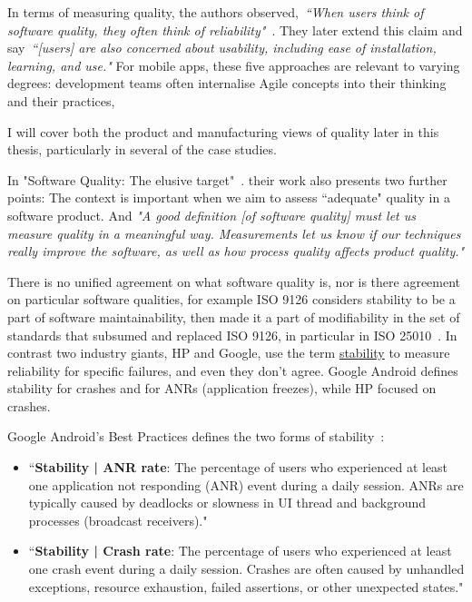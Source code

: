 In terms of measuring quality, the authors observed,~\emph{``When users think of software quality, they often think of reliability"}~\citep{kitchenham1996_software_quality_elusive_target}. They later extend this claim and say~\emph{``[users] are also concerned about usability, including ease of installation, learning, and use."}
%
For mobile apps, these five approaches are relevant to varying degrees: development teams often internalise Agile concepts into their thinking and their practices, %

I will cover both the product and manufacturing views of quality later in this thesis, particularly in several of the case studies.



In "Software Quality: The elusive target"~\cite{kitchenham1996_software_quality_elusive_target}. their work also presents two further points: The context is important when we aim to assess ``adequate" quality in a software product. And \emph{"A good definition [of software quality] must let us measure quality in a meaningful way. Measurements let us know if our techniques really improve the software, as well as how process quality affects product quality."}


There is no unified agreement on what software quality is, nor is there agreement on particular software qualities, for example ISO 9126 considers stability to be a part of software maintainability, then made it a part of modifiability in the set of standards that subsumed and replaced ISO 9126, in particular in ISO 25010~\citep{iso25010-2011-en}. In contrast two industry giants, HP and Google, use the term \href{glossary-stability}{stability} to measure reliability for specific failures, and even they don't agree. Google Android defines stability for crashes and for ANRs (application freezes), while HP focused on crashes. 

Google Android's Best Practices defines the two forms of stability~\citep{android_vitals_best_practices_key_metrics}:
\begin{itemize}
    \item ``\textbf{Stability | ANR rate}: The percentage of users who experienced at least one application not responding (ANR) event during a daily session. ANRs are typically caused by deadlocks or slowness in UI thread and background processes (broadcast receivers)."
    \item ``\textbf{Stability | Crash rate}: The percentage of users who experienced at least one crash event during a daily session. Crashes are often caused by unhandled exceptions, resource exhaustion, failed assertions, or other unexpected states."
\end{itemize}

